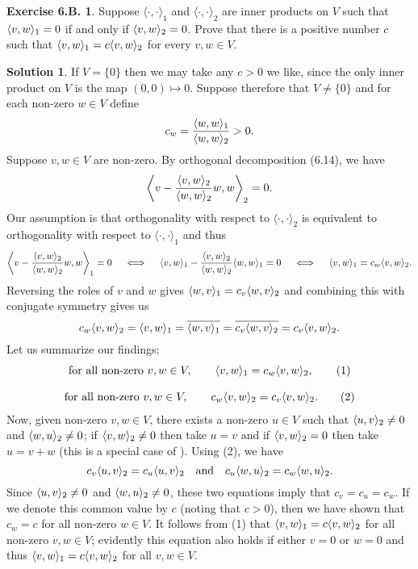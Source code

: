 \documentclass[12pt]{article}
\theoremstyle{definition}
\theoremstyle{exercise}
\newtheorem{exercise}{Exercise 6.B.}
\theoremstyle{solution}
\newtheorem*{solution}{Solution}
\newcommand{\quand}{\quad \text{and} \quad}
\newcommand{\ipanon}{\langle \cdot, \cdot \rangle}
\DeclarePairedDelimiter\ip{\langle}{\rangle}
\begin{document}
\begin{exercise}
\label{ex:11}
    Suppose \( \ipanon_1 \) and \( \ipanon_2 \) are inner products on \( V \) such that \( \ip{v, w}_1 = 0 \) if and only if \( \ip{v, w}_2 = 0 \). Prove that there is a positive number \( c \) such that \( \ip{v, w}_1 = c \ip{v, w}_2 \) for every \( v, w \in V \).
\end{exercise}

\begin{solution}
    If \( V = \{ 0 \} \) then we may take any \( c > 0 \) we like, since the only inner product on \( V \) is the map \( (0, 0) \mapsto 0 \). Suppose therefore that \( V \neq \{ 0 \} \) and for each non-zero \( w \in V \) define
    \[
        c_w = \frac{\ip{w, w}_1}{\ip{w, w}_2} > 0.
    \]
    Suppose \( v, w \in V \) are non-zero. By orthogonal decomposition (6.14), we have
    \[
        \ip*{ v - \frac{\ip{v, w}_2}{\ip{w, w}_2} w, w }_2 = 0.
    \]
    Our assumption is that orthogonality with respect to \( \ipanon_2 \) is equivalent to orthogonality with respect to \( \ipanon_1 \) and thus
    \[
        \ip*{ v - \frac{\ip{v, w}_2}{\ip{w, w}_2} w, w }_1 = 0 \quad \iff \quad \ip{v, w}_1 - \frac{\ip{v, w}_2}{\ip{w, w}_2} \ip{w, w}_1 = 0 \quad \iff \quad \ip{v, w}_1 = c_w \ip{v, w}_2.
    \]
    Reversing the roles of \( v \) and \( w \) gives \( \ip{w, v}_1 = c_v \ip{w, v}_2 \) and combining this with conjugate symmetry gives us
    \[
        c_w \ip{v, w}_2 = \ip{v, w}_1 = \overline{\ip{w, v}_1} = \overline{c_v \ip{w, v}_2} = c_v \ip{v, w}_2.
    \]
    Let us summarize our findings:
    \begin{gather*}
        \text{for all non-zero } v, w \in V, \qquad \ip{v, w}_1 = c_w \ip{v, w}_2, \tag{1} \\[3mm]
        \text{for all non-zero } v, w \in V, \qquad c_w \ip{v, w}_2 = c_v \ip{v, w}_2. \tag{2}
    \end{gather*}
    Now, given non-zero \( v, w \in V \), there exists a non-zero \( u \in V \) such that \( \ip{u, v}_2 \neq 0 \) and \( \ip{w, u}_2 \neq 0 \); if \( \ip{v, w}_2 \neq 0 \) then take \( u = v \) and if \( \ip{v, w}_2 = 0 \) then take \( u = v + w \) (this is a special case of ). Using (2), we have
    \[
        c_v \ip{u, v}_2 = c_u \ip{u, v}_2 \quand c_u \ip{w, u}_2 = c_w \ip{w, u}_2.
    \]
    Since \( \ip{u, v}_2 \neq 0 \) and \( \ip{w, u}_2 \neq 0 \), these two equations imply that \( c_v = c_u = c_w \). If we denote this common value by \( c \) (noting that \( c > 0 \)), then we have shown that \( c_w = c \) for all non-zero \( w \in V \). It follows from (1) that \( \ip{v, w}_1 = c \ip{v, w}_2 \) for all non-zero \( v, w \in V \); evidently this equation also holds if either \( v = 0 \) or \( w = 0 \) and thus \( \ip{v, w}_1 = c \ip{v, w}_2 \) for all \( v, w \in V \).
\end{solution}
\end{document}
